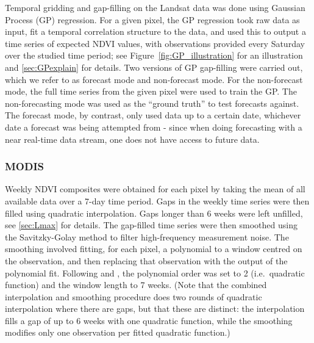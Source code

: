 \documentclass[review]{elsarticle}
\begin{document}
Temporal gridding and gap-filling on the Landsat data was done using Gaussian Process (GP) regression. For a given pixel, the GP regression took raw data as input, fit a temporal correlation structure to the data, and used this to output a time series of expected NDVI values, with observations provided every Saturday over the studied time period; see Figure~\ref{fig:GP_illustration} for an illustration and \ref{sec:GPexplain} for details. Two versions of GP gap-filling were carried out, which we refer to as forecast mode and non-forecast mode. For the non-forecast mode, the full time series from the given pixel were used to train the GP. The non-forecasting mode was used as the ``ground truth'' to test forecasts against. The forecast mode, by contrast, only used data up to a certain date, whichever date a forecast was being attempted from - since when doing forecasting with a near real-time data stream, one does not have access to future data. 


\subsubsection{MODIS}

Weekly NDVI composites were obtained for each pixel by taking the mean of all available data over a 7-day time period. Gaps in the weekly time series were then filled using quadratic interpolation. Gaps longer than 6 weeks were left unfilled, see \ref{sec:Lmax} for  details. The gap-filled time series were then smoothed using the Savitzky-Golay method \citep{Savitzky1964} to filter high-frequency measurement noise. The smoothing involved fitting, for each pixel, a polynomial to a window centred on the observation, and then replacing that observation with the output of the polynomial fit. Following \cite{Chen2004} and  \cite{bg-10-4055-2013}, the polynomial order was set to 2 (i.e.~quadratic function) and the window length to 7 weeks. (Note that the combined interpolation and smoothing procedure does two rounds of quadratic interpolation where there are gaps, but that these are distinct: the interpolation fills a gap of up to 6 weeks with one quadratic function, while the smoothing modifies only one observation per fitted quadratic function.)
\end{document}
